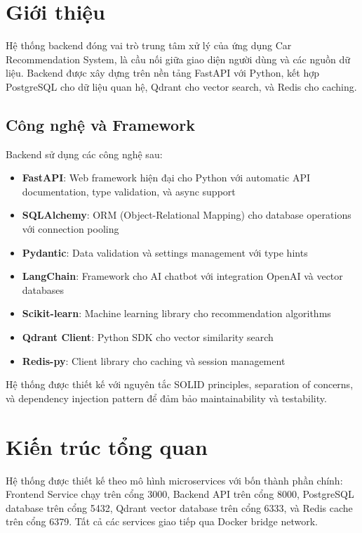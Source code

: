 \section{Giới thiệu}

Hệ thống backend đóng vai trò trung tâm xử lý của ứng dụng Car Recommendation System, là cầu nối giữa giao diện người dùng và các nguồn dữ liệu. Backend được xây dựng trên nền tảng FastAPI với Python, kết hợp PostgreSQL cho dữ liệu quan hệ, Qdrant cho vector search, và Redis cho caching.

\subsection{Công nghệ và Framework}

Backend sử dụng các công nghệ sau:

\begin{itemize}
    \item \textbf{FastAPI}: Web framework hiện đại cho Python với automatic API documentation, type validation, và async support
    \item \textbf{SQLAlchemy}: ORM (Object-Relational Mapping) cho database operations với connection pooling
    \item \textbf{Pydantic}: Data validation và settings management với type hints
    \item \textbf{LangChain}: Framework cho AI chatbot với integration OpenAI và vector databases
    \item \textbf{Scikit-learn}: Machine learning library cho recommendation algorithms
    \item \textbf{Qdrant Client}: Python SDK cho vector similarity search
    \item \textbf{Redis-py}: Client library cho caching và session management
\end{itemize}

Hệ thống được thiết kế với nguyên tắc SOLID principles, separation of concerns, và dependency injection pattern để đảm bảo maintainability và testability.

\section{Kiến trúc tổng quan}

Hệ thống được thiết kế theo mô hình microservices với bốn thành phần chính: Frontend Service chạy trên cổng 3000, Backend API trên cổng 8000, PostgreSQL database trên cổng 5432, Qdrant vector database trên cổng 6333, và Redis cache trên cổng 6379. Tất cả các services giao tiếp qua Docker bridge network.

